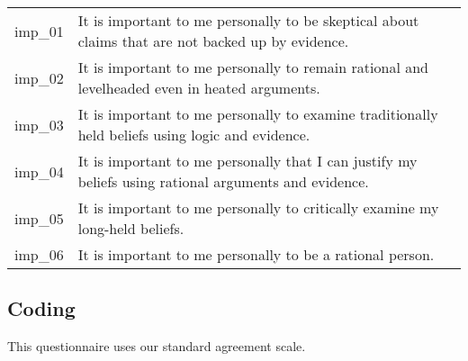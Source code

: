 \documentclass[
  letterpaper,
]{scrbook}
\begin{document}
\begin{longtable}[]{@{}
  >{\raggedright\arraybackslash}p{}
  >{\raggedright\arraybackslash}p{}@{}}
\toprule\noalign{}
\endhead
\bottomrule\noalign{}
\endlastfoot
imp\_01 & It is important to me personally to be skeptical about claims
that are not backed up by evidence. \\
imp\_02 & It is important to me personally to remain rational and
levelheaded even in heated arguments. \\
imp\_03 & It is important to me personally to examine traditionally held
beliefs using logic and evidence. \\
imp\_04 & It is important to me personally that I can justify my beliefs
using rational arguments and evidence. \\
imp\_05 & It is important to me personally to critically examine my
long-held beliefs. \\
imp\_06 & It is important to me personally to be a rational person. \\
\end{longtable}

\subsection*{Coding}\label{coding-17}

This questionnaire uses our standard agreement scale.
\end{document}
